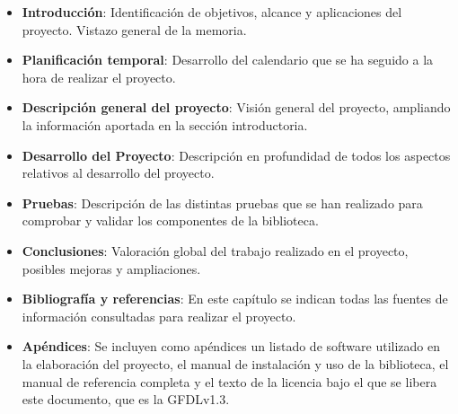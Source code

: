 \begin{itemize}
\item \textbf{Introducción}: Identificación de objetivos, alcance y aplicaciones del proyecto. Vistazo general de la memoria.
\item \textbf{Planificación temporal}: Desarrollo del calendario que se ha seguido a la hora de realizar el proyecto.
\item \textbf{Descripción general del proyecto}: Visión general del proyecto, ampliando la información aportada en la sección introductoria.
\item \textbf{Desarrollo del Proyecto}: Descripción en profundidad de todos los aspectos relativos al desarrollo del proyecto.
\item \textbf{Pruebas}: Descripción de las distintas pruebas que se han realizado para comprobar y validar los componentes de la biblioteca.
\item \textbf{Conclusiones}: Valoración global del trabajo realizado en el proyecto, posibles mejoras y ampliaciones.
\item \textbf{Bibliografía y referencias}: En este capítulo se indican todas las fuentes de información consultadas para realizar el proyecto.
\item \textbf{Apéndices}: Se incluyen como apéndices un listado de software utilizado en la elaboración del proyecto, el manual de instalación y uso de la biblioteca, el manual de referencia completa y el texto de la licencia bajo el que se libera este documento, que es la GFDLv1.3.
\end{itemize}

